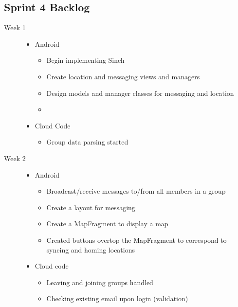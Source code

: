 \subsection{Sprint 4 Backlog}

\begin{description}
	\item[Week 1] \hfill
		\begin{itemize}
		\item Android
		\begin{itemize}
			\item Begin implementing Sinch
			\item Create location and messaging views and managers
			\item Design models and manager classes for messaging and location
			\item
		\end{itemize}
		\item Cloud Code
		\begin{itemize}
			\item Group data parsing started
		\end{itemize}
	\end{itemize}
	
  \item[Week 2] \hfill
		\begin{itemize}
		\item Android
		\begin{itemize}
			\item Broadcast/receive messages to/from all members in a group
			\item Create a layout for messaging
			\item Create a MapFragment to display a map
			\item Created buttons overtop the MapFragment to correspond to syncing and homing locations
		\end{itemize}
		\item Cloud code
		\begin{itemize}
			\item Leaving and joining groups handled
			\item Checking existing email upon login (validation)
		\end{itemize}
	\end{itemize}
  

\end{description}
